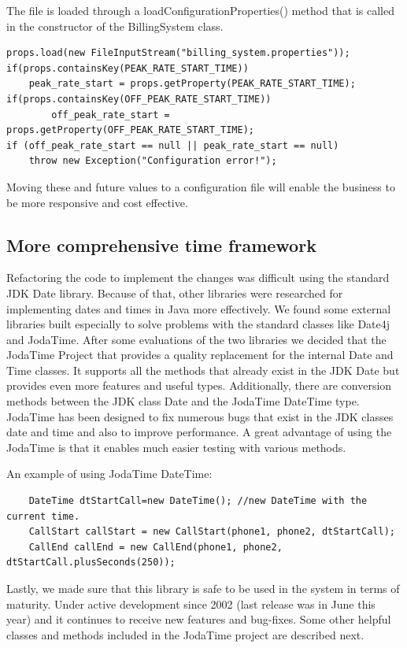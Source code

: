\documentclass[pdftex,11pt,a4paper]{article}
\begin{document}
The file is loaded through a loadConfigurationProperties() method that is called in the constructor of the BillingSystem class. 

\begin{lstlisting}
props.load(new FileInputStream("billing_system.properties"));
if(props.containsKey(PEAK_RATE_START_TIME))
	peak_rate_start = props.getProperty(PEAK_RATE_START_TIME);	if(props.containsKey(OFF_PEAK_RATE_START_TIME))
     	off_peak_rate_start = props.getProperty(OFF_PEAK_RATE_START_TIME);
if (off_peak_rate_start == null || peak_rate_start == null)
	throw new Exception("Configuration error!");	
\end{lstlisting}

Moving these and future values to a configuration file will enable the business to be more responsive and cost effective.

\subsection{More comprehensive time framework}
Refactoring the code to implement the changes was difficult using the standard JDK Date library. Because of that, other libraries were researched for implementing dates and times in Java more effectively. We found some external libraries built especially to solve problems with the standard classes like Date4j and JodaTime. After some evaluations of the two libraries we decided that the JodaTime Project that provides a quality replacement for the internal Date and Time classes. It supports all the methods that already exist in the JDK Date but provides even more features and useful types. Additionally, there are conversion methods between the JDK class Date and the JodaTime DateTime type. JodaTime has been designed to fix numerous bugs that exist in the JDK classes date and time and also to improve performance. A great advantage of using the JodaTime is that it enables much easier testing with various methods. 

An example of using JodaTime DateTime:
\begin{lstlisting}
	DateTime dtStartCall=new DateTime(); //new DateTime with the current time. 
	CallStart callStart = new CallStart(phone1, phone2, dtStartCall);
	CallEnd callEnd = new CallEnd(phone1, phone2, dtStartCall.plusSeconds(250));
\end{lstlisting}

Lastly, we made sure that this library is safe to be used in the system in terms of maturity. Under active development since 2002 (last release was in June this year) and it continues to receive new features and bug-fixes. Some other helpful classes and methods included in the JodaTime project are described next.
\end{document}
